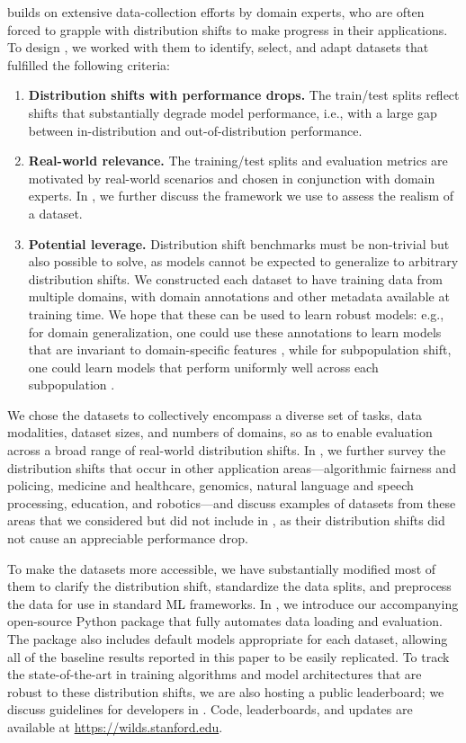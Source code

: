 \Wilds builds on extensive data-collection efforts by domain experts, who are often forced to grapple with distribution shifts to make progress in their applications.
To design \Wilds, we worked with them to identify, select, and adapt datasets that fulfilled the following criteria:
\begin{enumerate}
  \item \textbf{Distribution shifts with performance drops.} The train/test splits reflect shifts that substantially degrade model performance,
  i.e., with a large gap between in-distribution and out-of-distribution performance.
  \item \textbf{Real-world relevance.} The training/test splits and evaluation metrics are motivated by real-world scenarios and chosen in conjunction with domain experts. In , we further discuss the framework we use to assess the realism of a dataset.
  \item \textbf{Potential leverage.} Distribution shift benchmarks must be non-trivial but also possible to solve, as models cannot be expected to generalize to arbitrary distribution shifts. We constructed each \Wilds dataset to have training data from multiple domains, with domain annotations and other metadata available at training time. We hope that these can be used to learn robust models: e.g., for domain generalization, one could use these annotations to learn models that are invariant to domain-specific features \citep{sun2016deep,ganin2016domain}, while for subpopulation shift, one could learn models that perform uniformly well across each subpopulation \citep{hu2018does,sagawa2020group}.
\end{enumerate}
We chose the \Wilds datasets to collectively encompass a diverse set of tasks, data modalities, dataset sizes, and numbers of domains, so as to enable evaluation across a broad range of real-world distribution shifts.
In , we further survey the distribution shifts that occur in other application areas---algorithmic fairness and policing, medicine and healthcare, genomics, natural language and speech processing, education, and robotics---and discuss examples of datasets from these areas that we considered but did not include in \Wilds, as their distribution shifts did not cause an appreciable performance drop.

To make the \Wilds datasets more accessible, we have substantially modified most of them to clarify the distribution shift, standardize the data splits, and preprocess the data for use in standard ML frameworks.
In , we introduce our accompanying open-source Python package that fully automates data loading and evaluation. The package also includes default models appropriate for each dataset, allowing all of the baseline results reported in this paper to be easily replicated.
To track the state-of-the-art in training algorithms and model architectures that are robust to these distribution shifts, we are also hosting a public leaderboard; we discuss guidelines for developers in .
Code, leaderboards, and updates are available at \url{https://wilds.stanford.edu}.

